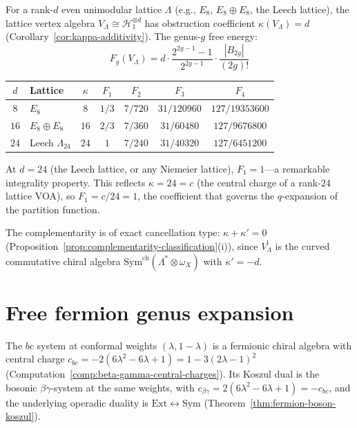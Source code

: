 \begin{computation}\label{comp:lattice-genus-expansion}
For a rank-$d$ even unimodular lattice $\Lambda$ (e.g., $E_8$, $E_8 \oplus E_8$, the Leech lattice), the lattice vertex algebra $V_\Lambda \cong \mathcal{H}_1^{\otimes d}$ has obstruction coefficient $\kappa(V_\Lambda) = d$ (Corollary~\ref{cor:kappa-additivity}).  The genus-$g$ free energy:
\begin{equation}\label{eq:lattice-Fg-arbitrary-rank}
F_g(V_\Lambda) = d \cdot \frac{2^{2g-1}-1}{2^{2g-1}} \cdot \frac{|B_{2g}|}{(2g)!}
\end{equation}
\begin{center}
\renewcommand{\arraystretch}{1.3}
\begin{tabular}{clccccc}
\toprule
$d$ & Lattice & $\kappa$ & $F_1$ & $F_2$ & $F_3$ & $F_4$ \\
\midrule
$8$ & $E_8$ & $8$ & $1/3$ & $7/720$ & $31/120960$ & $127/19353600$ \\[3pt]
$16$ & $E_8 \oplus E_8$ & $16$ & $2/3$ & $7/360$ & $31/60480$ & $127/9676800$ \\[3pt]
$24$ & Leech $\Lambda_{24}$ & $24$ & $1$ & $7/240$ & $31/40320$ & $127/6451200$ \\
\bottomrule
\end{tabular}
\end{center}
At $d = 24$ (the Leech lattice, or any Niemeier lattice), $F_1 = 1$---a remarkable integrality property.  This reflects $\kappa = 24 = c$ (the central charge of a rank-$24$ lattice VOA), so $F_1 = c/24 = 1$, the coefficient that governs the $q$-expansion of the partition function.

The complementarity is of exact cancellation type: $\kappa + \kappa' = 0$ (Proposition~\ref{prop:complementarity-classification}(i)), since $V_\Lambda^!$ is the curved commutative chiral algebra $\mathrm{Sym}^{\mathrm{ch}}(\Lambda^* \otimes \omega_X)$ with $\kappa' = -d$.
\end{computation}


\section{Free fermion genus expansion}\label{sec:fermion-genera}

The $bc$ system at conformal weights $(\lambda, 1-\lambda)$
is a fermionic chiral algebra with central charge
$c_{bc} = -2(6\lambda^2 - 6\lambda + 1) = 1 - 3(2\lambda-1)^2$
(Computation~\ref{comp:beta-gamma-central-charges}).
Its Koszul dual is the bosonic $\beta\gamma$-system at the same
weights, with $c_{\beta\gamma} = 2(6\lambda^2 - 6\lambda + 1)
= -c_{bc}$, and the underlying operadic duality is
$\mathrm{Ext} \leftrightarrow \mathrm{Sym}$
(Theorem~\ref{thm:fermion-boson-koszul}).

